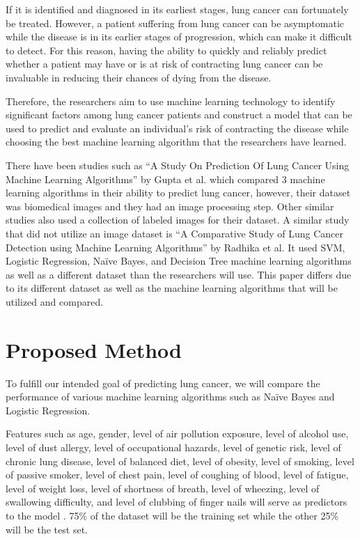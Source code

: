 \documentclass[runningheads]{llncs}
\begin{document}
If it is identified and diagnosed in its earliest stages, lung cancer can fortunately be treated. However, a patient suffering from lung cancer can be asymptomatic while the disease is in its earlier stages of progression, which can make it difficult to detect. For this reason, having the ability to quickly and reliably predict whether a patient may have or is at risk of contracting lung cancer can be invaluable in reducing their chances of dying from the disease.

Therefore, the researchers aim to use machine learning technology to identify significant factors among lung cancer patients and construct a model that can be used to predict and evaluate an individual's risk of contracting the disease while choosing the best machine learning algorithm that the researchers have learned.

There have been studies such as “A Study On Prediction Of Lung Cancer Using Machine Learning Algorithms” by Gupta et al. \cite{gupta2022} which compared 3 machine learning algorithms in their ability to predict lung cancer, however, their dataset was biomedical images and they had an image processing step. Other similar studies also used a collection of labeled images for their dataset. A similar study that did not utilize an image dataset is “A Comparative Study of Lung Cancer Detection using Machine Learning Algorithms” by Radhika et al. \cite{radhika2019} It used SVM, Logistic Regression, Naïve Bayes, and Decision Tree machine learning algorithms as well as a different dataset than the researchers will use. This paper differs due to its different dataset as well as the machine learning algorithms that will be utilized and compared.

\section{Proposed Method}

To fulfill our intended goal of predicting lung cancer, we will compare the performance of various machine learning algorithms such as Naïve Bayes and Logistic Regression. 

Features such as age, gender, level of air pollution exposure, level of alcohol use, level of dust allergy, level of occupational hazards, level of genetic risk, level of chronic lung disease, level of balanced diet, level of obesity, level of smoking, level of passive smoker, level of chest pain, level of coughing of blood, level of fatigue, level of weight loss, level of shortness of breath, level of wheezing, level of swallowing difficulty, and level of clubbing of finger nails will serve as predictors to the model \cite{devastator2022}. 75\% of the dataset will be the training set while the other 25\% will be the test set.
\end{document}
